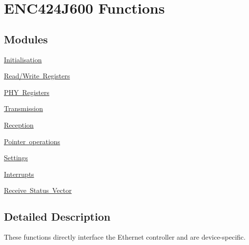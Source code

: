 \hypertarget{group__enc424j600__functions}{}\section{E\+N\+C424\+J600 Functions}
\label{group__enc424j600__functions}
\subsection*{Modules}
\begin{DoxyCompactItemize}
\item 
\mbox{\hyperlink{group__init}{Initialisation}}
\item 
\mbox{\hyperlink{group__readwrite}{Read/\+Write Registers}}
\item 
\mbox{\hyperlink{group__phy}{P\+H\+Y Registers}}
\item 
\mbox{\hyperlink{group__transmission}{Transmission}}
\item 
\mbox{\hyperlink{group__reception}{Reception}}
\item 
\mbox{\hyperlink{group__pointers}{Pointer operations}}
\item 
\mbox{\hyperlink{group__settings}{Settings}}
\item 
\mbox{\hyperlink{group__interrupts}{Interrupts}}
\item 
\mbox{\hyperlink{group__rsv}{Receive Status Vector}}
\end{DoxyCompactItemize}


\subsection{Detailed Description}
These functions directly interface the Ethernet controller and are device-\/specific. 